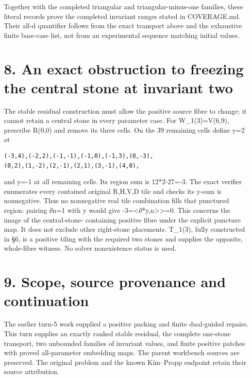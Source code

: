 \documentclass[
  10pt,
]{scrreprt}
\begin{document}
Together with the completed triangular and triangular-minus-one
families, these literal records prove the completed invariant ranges
stated in COVERAGE.md. Their all-d quantifier follows from the exact
transport above and the exhaustive finite base-case list, not from an
experimental sequence matching initial values.

\section{8. An exact obstruction to freezing the central stone at
invariant two}\label{edition-10-section-15}

The stable residual construction must allow the positive source fibre to
change; it cannot retain a central stone in every parameter case. For
W\_1(3)=V(6,9), prescribe R(0,0) and remove its three cells. On the 39
remaining cells define y=2 at

\begin{verbatim}
(-3,4),(-2,2),(-1,-1),(-1,0),(-1,3),(0,-3),
(0,2),(1,-2),(2,-1),(2,1),(3,-1),(4,0),
\end{verbatim}

and y=-1 at all remaining cells. Its region sum is 12*2-27=-3. The exact
verifier enumerates every contained original R,H,V,D tile and checks its
y-sum is nonnegative. Thus no nonnegative real tile combination fills
that punctured region: pairing ∂n=1 with y would give
-3=\textless∂*y,n\textgreater\textgreater=0. This concerns the image of
the central-stone- containing positive fibre under the explicit puncture
map. It does not exclude other right-stone placements. T\_1(3), fully
constructed in §6, is a positive tiling with the required two stones and
supplies the opposite, whole-fibre witness. No solver nonexistence
status is used.

\section{9. Scope, source provenance and
continuation}\label{edition-10-section-16}

The earlier turn-5 work supplied a positive packing and finite
dual-guided repairs. This turn supplies an exactly ranked stable
residual, the complete one-stone transport, two unbounded families of
invariant values, and finite positive patches with proved all-parameter
embedding maps. The parent workbench sources are preserved. The original
problem and the known Kim--Propp endpoint retain their source
attribution.
\end{document}
